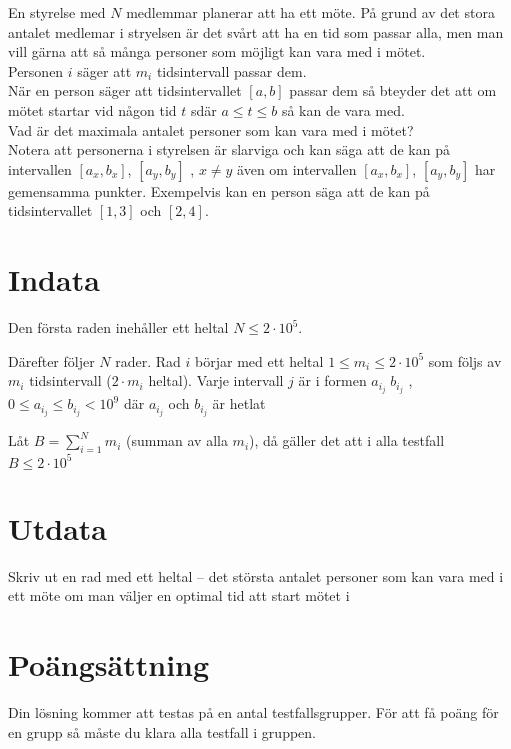 
En styrelse med $N$ medlemmar planerar att ha ett möte. På grund av det stora antalet medlemar i stryelsen är det svårt att ha en tid som passar alla, men man vill gärna att så många personer som möjligt kan vara med i mötet.\\ Personen $i$ säger att $m_i$ tidsintervall passar dem.\\
När en person säger att tidsintervallet $[a,b]$ passar dem så bteyder det att om mötet startar vid någon tid $t$ sdär $a\leq t \leq b$ så kan de vara med.\\
Vad är det maximala antalet personer som kan vara med i mötet?\\
Notera att personerna i styrelsen är slarviga och kan säga att de kan på intervallen $[a_x,b_x]$, $[a_y,b_y]$ , $x \neq y$ även om intervallen $[a_x,b_x]$, $[a_y,b_y]$ har gemensamma punkter. Exempelvis kan en person säga att de kan på tidsintervallet $[1,3]$ och $[2,4]$.
\section*{Indata}
Den första raden inehåller ett heltal $N \leq 2\cdot 10^5$.

Därefter följer $N$ rader. Rad $i$ börjar med ett heltal $1 \leq m_i \leq 2\cdot 10^5 $ som följs av $m_i$ tidsintervall ($2 \cdot m_i$ heltal). Varje intervall $j$ är i formen $a_i_j\; b_i_j$ , $0\leq a_i_j\leq b_i_j<10^9$ där $a_i_j$ och  $b_i_j$ är hetlat 

Låt $B=\sum_{i=1}^{N} m_i$ (summan av alla $m_i$), då gäller det att i alla testfall $B \leq 2\cdot 10^5$

\section*{Utdata}
Skriv ut en rad med ett heltal -- det största antalet personer som kan vara med i ett möte om man väljer en optimal tid att start mötet i

\section*{Poängsättning}
Din lösning kommer att testas på en antal testfallsgrupper.
För att få poäng för en grupp så måste du klara alla testfall i gruppen.

